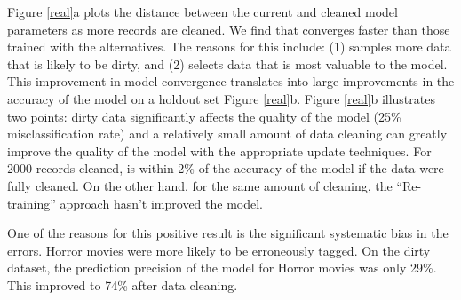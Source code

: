 % 

Figure \ref{real}a plots the distance between the current and cleaned model parameters as more records are cleaned. 
We find that \sys converges faster than those trained with the alternatives.
The reasons for this include: (1) \sys samples more data that is likely to be dirty, and (2) \sys selects data that is most valuable to the model.
This improvement in model convergence translates into large improvements in the accuracy of the model on a holdout set Figure \ref{real}b.
Figure \ref{real}b illustrates two points: dirty data significantly affects the quality of the model (25\% misclassification rate) and a relatively small amount of data cleaning can greatly improve the quality of the model with the appropriate update techniques.
For 2000 records cleaned, \sys is within 2\% of the accuracy of the model if the data were fully cleaned.
On the other hand, for the same amount of cleaning, the ``Re-training'' approach hasn't improved the model. 

One of the reasons for this positive result is the significant systematic bias in the errors. Horror movies were more likely to be erroneously tagged. 
On the dirty dataset, the prediction precision of the model for Horror movies was only 29\%.
This improved to 74\% after data cleaning.

